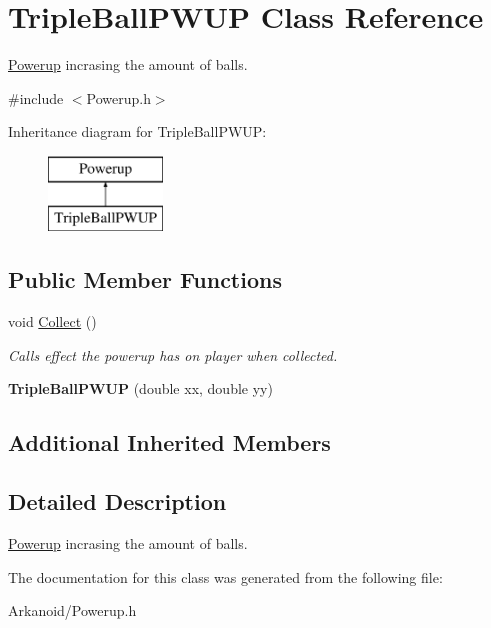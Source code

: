 \hypertarget{class_triple_ball_p_w_u_p}{}\section{Triple\+Ball\+P\+W\+UP Class Reference}
\label{class_triple_ball_p_w_u_p}


\hyperlink{class_powerup}{Powerup} incrasing the amount of balls.  




{\ttfamily \#include $<$Powerup.\+h$>$}

Inheritance diagram for Triple\+Ball\+P\+W\+UP\+:\begin{figure}[H]
\begin{center}
\leavevmode
\includegraphics[height=2.000000cm]{class_triple_ball_p_w_u_p}
\end{center}
\end{figure}
\subsection*{Public Member Functions}
\begin{DoxyCompactItemize}
\item 
\mbox{\label{class_triple_ball_p_w_u_p_ab4b1284f2edbe00bc9159fedb548032b}} 
void \hyperlink{class_triple_ball_p_w_u_p_ab4b1284f2edbe00bc9159fedb548032b}{Collect} ()
\begin{DoxyCompactList}\small\item\em Calls effect the powerup has on player when collected. \end{DoxyCompactList}\item 
\mbox{\label{class_triple_ball_p_w_u_p_a1d139789a8b46027955699e69afbeb6f}} 
{\bfseries Triple\+Ball\+P\+W\+UP} (double xx, double yy)
\end{DoxyCompactItemize}
\subsection*{Additional Inherited Members}


\subsection{Detailed Description}
\hyperlink{class_powerup}{Powerup} incrasing the amount of balls. 

The documentation for this class was generated from the following file\+:\begin{DoxyCompactItemize}
\item 
Arkanoid/Powerup.\+h\end{DoxyCompactItemize}
